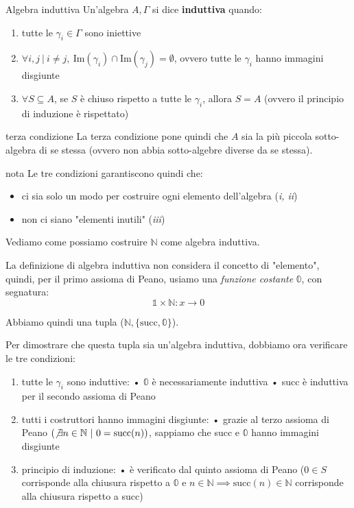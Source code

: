 \documentclass[a4paper,11pt]{report}
\begin{document}
\begin{defbox}{Algebra induttiva}{}
    Un'algebra \( A, \Gamma \) si dice \textbf{induttiva} quando:
    \begin{enumerate}
        \item tutte le \( \gamma_i \in \Gamma\) sono iniettive
        \item \( \forall i, j \ | \ i \neq j , \ \text{Im}(\gamma_i) \cap \text{Im}(\gamma_j) = \emptyset \), ovvero tutte le \( \gamma_i \) hanno immagini disgiunte
        \item \( \forall S\subseteq A \), se \( S \) è chiuso rispetto a tutte le \( \gamma_i \), allora \( S = A \) (ovvero il principio di induzione è rispettato)   
    \end{enumerate}
    \begin{gbox}{terza condizione}
        La terza condizione pone quindi che \( A \) sia la più piccola sotto-algebra di se stessa (ovvero non abbia sotto-algebre diverse da se stessa).
    \end{gbox}       
    \begin{gbox}{nota}
        Le tre condizioni garantiscono quindi che:
        \begin{itemize}
            \item ci sia solo un modo per costruire ogni elemento dell'algebra (\textit{i, ii})
            \item non ci siano "elementi inutili" (\textit{iii})
        \end{itemize}
    \end{gbox}

\end{defbox}

Vediamo come possiamo costruire \( \mathbb{N} \) come algebra induttiva.

La definizione di algebra induttiva non considera il concetto di "elemento", quindi, per il primo assioma di Peano, usiamo una \textit{funzione costante} \( \mathbb{0} \), con segnatura:
\[\mathbb{1} \times \mathbb{N} : x\to 0 \]

Abbiamo quindi una tupla (\( \mathbb{N}, \{\text{succ}, \mathbb{0}\} \)).

Per dimostrare che  questa tupla sia un'algebra induttiva, dobbiamo ora verificare le tre condizioni:
\begin{enumerate}
    \item tutte le \( \gamma_i \) sono induttive:
        \subitem • \( \mathbb{0} \) è necessariamente induttiva
        \subitem • succ è induttiva per il secondo assioma di Peano
    \item tutti i costruttori hanno immagini disgiunte:
        \subitem • grazie al terzo assioma di Peano \((\not\exists n \in \mathbb{N} \ | \ 0 = \text{succ}(n)) \), sappiamo che succ e \( \mathbb{0} \) hanno immagini disgiunte
    \item principio di induzione:
        \subitem • è verificato dal quinto assioma di Peano (\( 0 \in S\) corrisponde alla chiusura rispetto a \(\mathbb{0} \) e \( n \in \mathbb{N} \implies \text{succ}(n) \in \mathbb{N}\) corrisponde alla chiusura rispetto a succ)
\end{enumerate}
\end{document}
